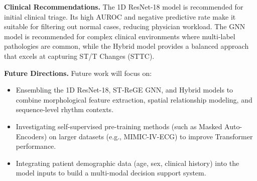 \documentclass[12pt,a4paper]{report}
\begin{document}
\textbf{Clinical Recommendations.} The 1D ResNet-18 model is recommended for initial clinical triage. Its high AUROC and negative predictive rate make it suitable for filtering out normal cases, reducing physician workload. The GNN model is recommended for complex clinical environments where multi-label pathologies are common, while the Hybrid model provides a balanced approach that excels at capturing ST/T Changes (STTC).

\textbf{Future Directions.} Future work will focus on:
\begin{itemize}
    \item Ensembling the 1D ResNet-18, ST-ReGE GNN, and Hybrid models to combine morphological feature extraction, spatial relationship modeling, and sequence-level rhythm contexts.
    \item Investigating self-supervised pre-training methods (such as Masked Auto-Encoders) on larger datasets (e.g., MIMIC-IV-ECG) to improve Transformer performance.
    \item Integrating patient demographic data (age, sex, clinical history) into the model inputs to build a multi-modal decision support system.
\end{itemize}

\clearpage
\end{document}

